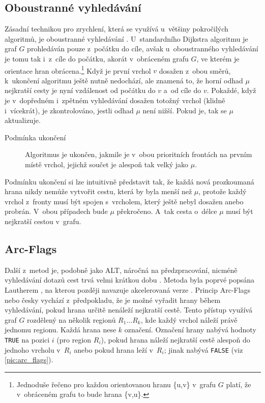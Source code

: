 \subsection{Oboustranné vyhledávání}
\label{sec:oboustranvyhl}
Zásadní technikou pro zrychlení, která se využívá u~většiny pokročilých algoritmů, je oboustranné vyhledávání \cite{bauer2011experimental}. U~standardního Dijkstra algoritmu je graf $G$ prohledáván pouze z~počátku do cíle, avšak u~oboustranného vyhledávání je tomu tak i~z~cíle do počátku, akorát v~obráceném grafu $G$, ve kterém je orientace hran obrácena.\footnote{Jednoduše řečeno pro každou orientovanou hranu \{u,v\} v~grafu \(G\) platí, že v~obráceném grafu to bude hrana \{v,u\}.} Když je první vrchol $v$ dosažen z~obou směrů, k~ukončení algoritmu ještě nutně nedochází, ale znamená to, že horní odhad $\mu$ nejkratší cesty je nyní vzdálenost od počátku do $v$ a~od cíle do $v$. Pokaždé, když je v~dopředném i~zpětném vyhledávání dosažen totožný vrchol (klidně i~vícekrát), je zkontrolováno, jestli odhad $\mu$ není nižší. Pokud je, tak se \(\mu\) aktualizuje. 

\begin{description}
	\item[Podmínka ukončení] Algoritmus je ukončen, jakmile je v~obou prioritních frontách na prvním místě vrchol, jejichž součet je alespoň tak velký jako $\mu$.
\end{description}

Podmínku ukončení si lze intuitivně představit tak, že každá nová prozkoumaná hrana nikdy nemůže vytvořit cestu, která by byla menší než $\mu$, protože každý vrchol z~fronty musí být spojen s~vrcholem, který ještě nebyl dosažen anebo probrán. V~obou případech bude $\mu$ překročeno. A~tak cesta o~délce $\mu$ musí být nejkratší cestou v~grafu.

\renewcommand{\figureautorefname}{obrázek}
\subsection{Arc-Flags}
Další z~metod je, podobně jako ALT, náročná na předzpracování, nicméně vyhledávání dotazů cest trvá velmi krátkou dobu \cite{bauer2011experimental}. Metoda byla poprvé popsána Lautherem \cite{lauther05Arcs}, na kterou později navazuje akcelerovaná verze \cite{kohler2005acceleration}. Princip Arc-Flags nebo česky  vychází z~předpokladu, že je možné vyřadit hrany během vyhledávání, pokud hrana určitě nenáleží nejkratší cestě. Tento přístup využívá graf $G$ rozdělený na několik regionů $R_1\ldots R_k$, kde každý vrchol náleží právě jednomu regionu. Každá hrana nese $k$ označení. Označení hrany nabývá hodnoty \texttt{TRUE} na pozici $i$ (pro region $R_i$), pokud hrana náleží nejkratší cestě alespoň do jednoho vrcholu v~$R_i$ anebo pokud hrana leží v~$R_i$; jinak nabývá \texttt{FALSE} (viz \autoref{pic:arc_flags}).
\renewcommand{\figureautorefname}{obrázku}

